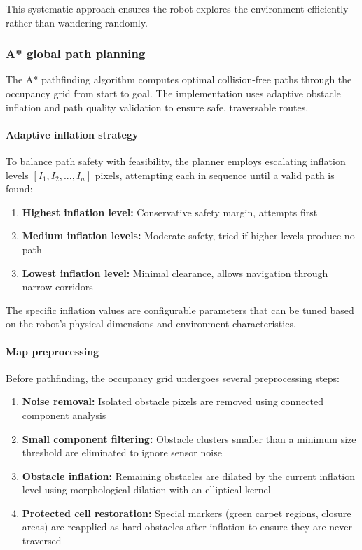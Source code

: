 \documentclass{article}
\begin{document}
This systematic approach ensures the robot explores the environment efficiently rather than wandering randomly.

\subsubsection{A* global path planning}

The A* pathfinding algorithm computes optimal collision-free paths through the occupancy grid from start to goal. The implementation uses adaptive obstacle inflation and path quality validation to ensure safe, traversable routes.

\paragraph{Adaptive inflation strategy}

To balance path safety with feasibility, the planner employs escalating inflation levels $[I_1, I_2, ..., I_n]$ pixels, attempting each in sequence until a valid path is found:

\begin{enumerate}
    \item \textbf{Highest inflation level:} Conservative safety margin, attempts first
    \item \textbf{Medium inflation levels:} Moderate safety, tried if higher levels produce no path
    \item \textbf{Lowest inflation level:} Minimal clearance, allows navigation through narrow corridors
\end{enumerate}

\noindent The specific inflation values are configurable parameters that can be tuned based on the robot's physical dimensions and environment characteristics.

\paragraph{Map preprocessing}

Before pathfinding, the occupancy grid undergoes several preprocessing steps:

\begin{enumerate}
    \item \textbf{Noise removal:} Isolated obstacle pixels are removed using connected component analysis
    \item \textbf{Small component filtering:} Obstacle clusters smaller than a minimum size threshold are eliminated to ignore sensor noise
    \item \textbf{Obstacle inflation:} Remaining obstacles are dilated by the current inflation level using morphological dilation with an elliptical kernel
    \item \textbf{Protected cell restoration:} Special markers (green carpet regions, closure areas) are reapplied as hard obstacles after inflation to ensure they are never traversed

\end{enumerate}
\end{document}

